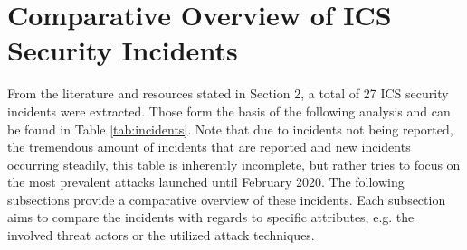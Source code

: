 \documentclass[runningheads]{llncs}
\begin{document}
\section{Comparative Overview of ICS Security Incidents}
From the literature and resources stated in Section 2, a total of 27 ICS security incidents were extracted.
Those form the basis of the following analysis and can be found in Table \ref{tab:incidents}.
Note that due to incidents not being reported, the tremendous amount of incidents that are reported and new incidents occurring steadily, this table is inherently incomplete, but rather tries to focus on the most prevalent attacks launched until February 2020.
The following subsections provide a comparative overview of these incidents.
Each subsection aims to compare the incidents with regards to specific attributes, e.g. the involved threat actors or the utilized attack techniques.
\end{document}
